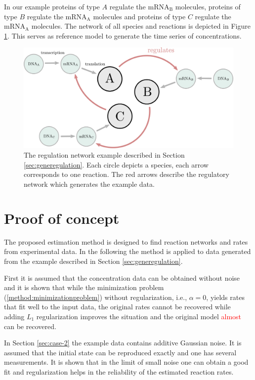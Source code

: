 \documentclass[oneside, abstracton, titlepage]{scrartcl}
\begin{document}
    In our example proteins of type $A$ regulate the mRNA$_\mathrm{B}$ molecules, proteins of type $B$ regulate the mRNA$_\mathrm{A}$ molecules and proteins of type $C$ regulate the mRNA$_\mathrm{A}$ molecules. The network of all species and reactions is depicted in Figure \ref{fig:network}. This serves as reference model to generate the time series of concentrations.
    \begin{figure}
        \centering
        \includegraphics[width=.5\textwidth]{./figures_tex/gene_regulation_full.pdf}
        \caption{The regulation network example described in Section \ref{sec:generegulation}. Each circle depicts a species, each arrow corresponds to one reaction. The red arrows describe the regulatory network which generates the example data.}
        \label{fig:network}
    \end{figure}

	\section{Proof of concept}\label{sec:proof-of-concept}
	
	The proposed estimation method is designed to find reaction networks and rates from experimental data. In the following the method is applied to data generated from the example described in Section \ref{sec:generegulation}.

	First it is assumed that the concentration data can be obtained without noise and it is shown that while the minimization problem (\ref{method:minimizationproblem}) without regularization, i.e., $\alpha=0$, yields rates that fit well to the input data, the original rates cannot be recovered while adding $L_1$ regularization improves the situation and the original model \textcolor{red}{almost} can be recovered.
	
	In Section \ref{sec:case-2} the example data contains additive Gaussian noise. It is assumed that the initial state can be reproduced exactly and one has several measurements. It is shown that in the limit of small noise one can obtain a good fit and regularization helps in the reliability of the estimated reaction rates.
	
\end{document}
